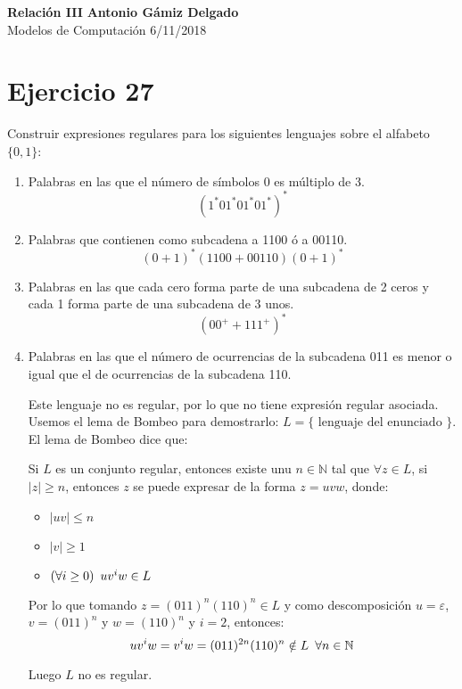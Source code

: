 \documentclass[a4paper, 11pt]{article}
\begin{document}
\noindent
\large\textbf{Relación III} \hfill \textbf{Antonio Gámiz Delgado} \\
\normalsize Modelos de Computación \hfill 6/11/2018

\section*{Ejercicio 27}
Construir expresiones regulares para los siguientes lenguajes sobre el alfabeto $\{0,1\}$:
\begin{enumerate}
\item Palabras en las que el número de símbolos 0 es múltiplo de 3.
\[
(1^*01^*01^*01^*)^*
\]
\item Palabras que contienen como subcadena a 1100 ó a 00110.
\[
(0+1)^*(1100+00110)(0+1)^*
\]
\item Palabras en las que cada cero forma parte de una subcadena de 2 ceros y cada 1 forma parte de una subcadena de 3 unos.
\[
(00^++111^+)^*
\]
\item Palabras en las que el número de ocurrencias de la subcadena 011 es menor o igual que el de ocurrencias de la subcadena 110.

Este lenguaje no es regular, por lo que no tiene expresión regular asociada. Usemos el lema de Bombeo para demostrarlo: $L=\{\text{ lenguaje del enunciado }\}$.
El lema de Bombeo dice que:

Si $L$ es un conjunto regular, entonces existe unu $n\in\mathbb{N}$ tal que $\forall z \in L$, si $|z|\geq n$, entonces $z$ se puede expresar de la forma $z=uvw$, donde:
\begin{itemize}
\item $|uv|\leq n$
\item $|v|\geq 1$
\item $(\forall i \geq 0) \enskip uv^iw \in L$
\end{itemize}

Por lo que tomando $z = (011)^n(110)^n\in L$ y como descomposición $u=\varepsilon$, $v=(011)^n$ y $w=(110)^n$ y $i=2$, entonces:
\[
uv^iw=v^iw=(011)^{2n}(110)^n\notin L \enskip \forall n \in \mathbb{N}
\]

Luego $L$ no es regular.

\end{enumerate}
\end{document}
